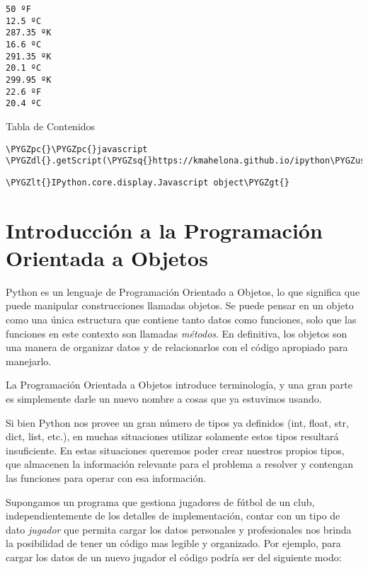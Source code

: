 \documentclass[a4paper,12pt,spanish]{sphinxmanual}
\def\PYGZus{\char`\_}
\def\PYGZlt{\char`\<}
\def\PYGZgt{\char`\>}
\def\PYGZpc{\char`\%}
\def\PYGZdl{\char`\$}
\def\PYGZsq{\char`\'}
\renewcommand\PYGZsq{\textquotesingle}
\begin{document}
\begin{Verbatim}[commandchars=\\\{\}]
50 ºF
12.5 ºC
287.35 ºK
16.6 ºC
291.35 ºK
20.1 ºC
299.95 ºK
22.6 ºF
20.4 ºC
\end{Verbatim}

Tabla de Contenidos

\begin{Verbatim}[commandchars=\\\{\}]
\PYGZpc{}\PYGZpc{}javascript
\PYGZdl{}.getScript(\PYGZsq{}https://kmahelona.github.io/ipython\PYGZus{}notebook\PYGZus{}goodies/ipython\PYGZus{}notebook\PYGZus{}toc.js\PYGZsq{})
\end{Verbatim}

\begin{Verbatim}[commandchars=\\\{\}]
\PYGZlt{}IPython.core.display.Javascript object\PYGZgt{}
\end{Verbatim}


\chapter{Introducción a la Programación Orientada a Objetos}
\label{Unidad05::doc}\label{Unidad05:introduccion-a-la-programacion-orientada-a-objetos}
Python es un lenguaje de Programación Orientado a Objetos, lo que
significa que puede manipular construcciones llamadas objetos. Se puede
pensar en un objeto como una única estructura que contiene tanto datos
como funciones, solo que las funciones en este contexto son llamadas
\emph{métodos}. En definitiva, los objetos son una manera de organizar datos
y de relacionarlos con el código apropiado para manejarlo.

La Programación Orientada a Objetos introduce terminología, y una gran
parte es simplemente darle un nuevo nombre a cosas que ya estuvimos
usando.

Si bien Python nos provee un gran número de tipos ya definidos (int,
float, str, dict, list, etc.), en muchas situaciones utilizar solamente
estos tipos resultará insuficiente. En estas situaciones queremos poder
crear nuestros propios tipos, que almacenen la información relevante
para el problema a resolver y contengan las funciones para operar con
esa información.

Supongamos un programa que gestiona jugadores de fútbol de un club,
independientemente de los detalles de implementación, contar con un tipo
de dato \emph{jugador} que permita cargar los datos personales y
profesionales nos brinda la posibilidad de tener un código mas legible y
organizado. Por ejemplo, para cargar los datos de un nuevo jugador el
código podría ser del siguiente modo:
\end{document}
